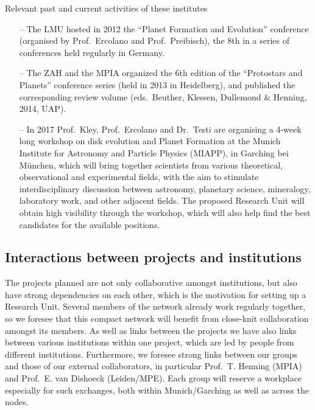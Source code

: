 \documentclass[10pt,fleqn,twoside]{article}
\begin{document}
\begin{Emphasize}
Relevant past and current activities of these institutes
\end{Emphasize}
\begin{itemize}
\item[--] The LMU hosted in 2012 the ``Planet Formation and Evolution''
conference (organised by Prof.~Ercolano and Prof.~Preibisch), the 8th
in a series of conferences held regularly in Germany.
\item[--] The ZAH and the MPIA organized the 6th edition of the
``Protostars and Planets'' conference series (held in 2013 in Heidelberg), 
and published the corresponding review volume (eds.~Beuther,
Klessen, Dullemond \& Henning, 2014, UAP).
\item[--] In 2017
Prof.~Kley, Prof.~Ercolano and Dr.~Testi are organising a 4-week
long workshop on disk evolution and Planet Formation at the Munich
Institute for Astronomy and Particle Physics (MIAPP), in Garching bei
M\"unchen, which will bring
together scientists from various theoretical, observational and
experimental fields, with the aim to stimulate interdisciplinary
discussion between astronomy, planetary science, mineralogy,
laboratory work, and other adjacent fields. The proposed Research Unit
will obtain high visibility through the workshop, which will also help
find the best candidates for the available positions. 
\end{itemize}


\subsection{Interactions between projects and institutions}
\label{sec-interactions-between-projects}
\noindent The projects planned are not only collaborative amongst institutions,
but also have strong dependencies on each other, which is the
motivation for setting up a Research Unit. Several members of the
network already work regularly together, so we foresee that this compact
network will benefit from close-knit collaboration amongst its members.
As well as links between the projects we have also links between
various institutions within one project, which are led by people from
different institutions. Furthermore, we foresee
strong links between our groups and those of our external
collaborators, in particular Prof.~T. Henning (MPIA) and Prof.~E. van
Dishoeck (Leiden/MPE). Each group will reserve a workplace especially 
for such exchanges, both within Munich/Garching as well as across the nodes. 
\end{document}
